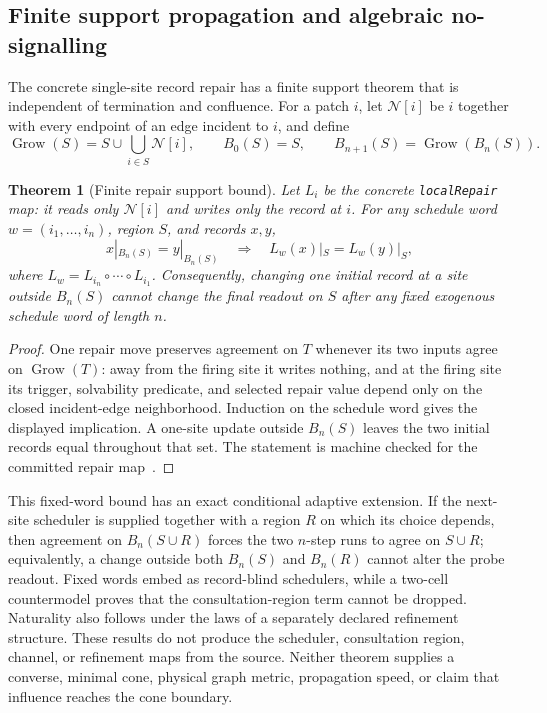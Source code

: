 \documentclass[11pt]{article}
\newtheorem{theorem}{Theorem}[section]
\theoremstyle{remark}
\theoremstyle{plain}
\begin{document}
\subsection{Finite support propagation and algebraic no-signalling}

The concrete single-site record repair has a finite support theorem that is
independent of termination and confluence.  For a patch \(i\), let
\(\mathcal N[i]\) be \(i\) together with every endpoint of an edge incident to
\(i\), and define
\[
  \operatorname{Grow}(S)=S\cup\bigcup_{i\in S}\mathcal N[i],
  \qquad
  B_0(S)=S,
  \qquad
  B_{n+1}(S)=\operatorname{Grow}(B_n(S)).
\]

\begin{theorem}[Finite repair support bound]
\label{thm:finite-repair-support-bound}
Let \(L_i\) be the concrete \texttt{localRepair} map: it reads only
\(\mathcal N[i]\) and writes only the record at \(i\).  For any schedule word
\(w=(i_1,\ldots,i_n)\), region \(S\), and records \(x,y\),
\[
  x|_{B_n(S)}=y|_{B_n(S)}
  \quad\Longrightarrow\quad
  L_w(x)|_S=L_w(y)|_S,
\]
where \(L_w=L_{i_n}\circ\cdots\circ L_{i_1}\).  Consequently, changing one
initial record at a site outside \(B_n(S)\) cannot change the final readout on
\(S\) after any fixed exogenous schedule word of length \(n\).
\end{theorem}

\begin{proof}
One repair move preserves agreement on \(T\) whenever its two inputs agree on
\(\operatorname{Grow}(T)\): away from the firing site it writes nothing, and
at the firing site its trigger, solvability predicate, and selected repair
value depend only on the closed incident-edge neighborhood.  Induction on the
schedule word gives the displayed implication.  A one-site update outside
\(B_n(S)\) leaves the two initial records equal throughout that set.  The
statement is machine checked for the committed repair map~\cite{ophrepo}.
\end{proof}

This fixed-word bound has an exact conditional adaptive extension.  If the
next-site scheduler is supplied together with a region \(R\) on which its
choice depends, then agreement on \(B_n(S\cup R)\) forces the two \(n\)-step
runs to agree on \(S\cup R\); equivalently, a change outside both
\(B_n(S)\) and \(B_n(R)\) cannot alter the probe readout.  Fixed words embed
as record-blind schedulers, while a two-cell countermodel proves that the
consultation-region term cannot be dropped.  Naturality also follows under
the laws of a separately declared refinement structure.  These results do
not produce the scheduler, consultation region, channel, or refinement maps
from the source.  Neither theorem supplies a converse, minimal cone, physical
graph metric, propagation speed, or claim that influence reaches the cone
boundary.
\end{document}
